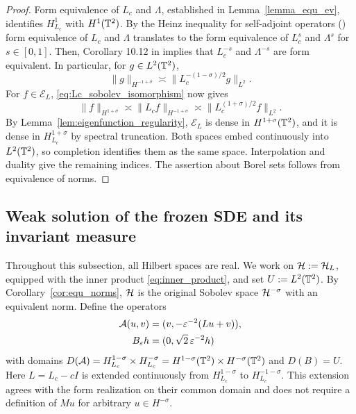 \begin{proof}

Form equivalence of $L_c$ and $\Lambda$, established in Lemma~\ref{lemma_equ_ev}, identifies \(H_{L_c}^1\) with \(H^1(\mathbb{T}^2)\). By the Heinz inequality for self-adjoint operators (\cite[Proposition 10.14]{schmudgen_operators}) form equivalence of $L_c$ and $\Lambda$ translates to the form equivalence of $L_c^{s}$ and $\Lambda^{s}$ for $s \in [0,1]$. Then, Corollary 10.12 in \cite{schmudgen_operators} implies that $L_c^{-s}$ and $\Lambda^{-s}$ are form equivalent. In particular, for \(g\in L^2(\mathbb{T}^2)\),
\[
 \|g\|_{H^{-1+\sigma}}
 \asymp\|L_c^{-(1-\sigma)/2}g\|_{L^2}.
\]
For \(f\in\mathscr E_L\), \eqref{eq:Lc_sobolev_isomorphism} now gives
\[
 \|f\|_{H^{1+\sigma}}
 \asymp\|L_c f\|_{H^{-1+\sigma}}
 \asymp\|L_c^{(1+\sigma)/2}f\|_{L^2}.
\]
By Lemma~\ref{lem:eigenfunction_regularity}, \(\mathscr E_L\) is dense
in \(H^{1+\sigma}(\mathbb{T}^2)\), and it is dense in \(H_{L_c}^{1+\sigma}\) by spectral
truncation.  Both spaces embed continuously into \(L^2(\mathbb{T}^2)\), so completion identifies
them as the same space. Interpolation and duality give the remaining indices.
The assertion about Borel sets follows from equivalence of norms.
\end{proof}

\subsection{Weak solution of the frozen SDE and its invariant measure}\label{sec_invdynamics_unique}
Throughout this subsection, all Hilbert spaces are real. We work on
\(\mathcal{H}:=\mathcal{H}_L\), equipped with the inner product
\eqref{eq:inner_product}, and set \(U:=L^2(\mathbb{T}^2)\).
By Corollary~\ref{cor:equ_norms}, \(\mathcal{H}\) is the original Sobolev space \(\mathcal{H}^{-\sigma}\) with an equivalent norm.
Define the operators 
\begin{equation}\label{eq:generator}
 \begin{split}
 \mathcal A(u,v)&=(v,-\varepsilon^{-2}(Lu+v)),\\
 B_\varepsilon h&=(0,\sqrt2\,\varepsilon^{-2}h)
 \end{split}
\end{equation}
with domains $D(\mathcal A)=H_{L_c}^{1-\sigma}\times H_{L_c}^{-\sigma} =H^{1-\sigma}(\mathbb{T}^2)\times H^{-\sigma}(\mathbb{T}^2)$ and $D(B) = U$.
Here \(L=L_c-cI\) is extended continuously from
\(H_{L_c}^{1-\sigma}\) to \(H_{L_c}^{-1-\sigma}\).
This extension agrees with the form realization on their common
domain and does not require a definition of \(Mu\) for arbitrary
\(u\in H^{-\sigma}\).

